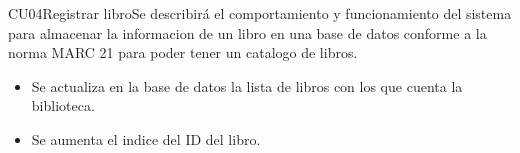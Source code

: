 \begin{UseCase}{CU04}{Registrar libro}{Se describirá el comportamiento y funcionamiento del sistema para almacenar la informacion de un libro
en una base de datos conforme a la norma MARC 21 para poder tener un catalogo de libros.
}
{\begin{itemize}
				\item Se actualiza en la base de datos la lista de libros con los que cuenta la biblioteca.		\item Se aumenta el indice del ID del libro.
		\end{itemize}			
		}
\end{UseCase}

